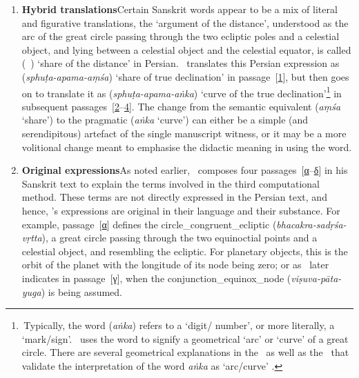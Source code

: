 \begin{enumerate}[topsep=0pt]
    \item \textbf{Hybrid translations}\quad Certain Sanskrit words appear to be a mix of literal and figurative translations, \eg 
    the `argument of the distance', understood as the arc of the great circle passing through the two ecliptic poles and a celestial object, and lying between a celestial object and the celestial equator, is called  (\hissi\idafavowel\ \bud) `share of the distance' in Persian.
    \Nityananda\ translates this Persian expression as  (\textit{sphuṭa-apama-aṃśa}) `share of true declination' in passage~[\hyperlink{SEpass1}{1}], but then goes on to translate it as  (\textit{sphuṭa-apama-aṅka}) `curve of the true declination'\footnote{\,Typically, the word  (\textit{aṅka}) refers to a `digit/ number', or more literally, a `mark/sign'. \Nityananda\ uses the word to signify a geometrical `arc' or `curve' of a great circle. There are several geometrical explanations in the \Siddhantasindhu\ as well as the \Sarvasiddhantaraja\ that validate the interpretation of the word \textit{aṅka} as `arc/curve' \parencite[\eg \vid][279]{Misrathesis}.} in subsequent passages~[\hyperlink{SEpass2}{2}--\hyperlink{SEpass4}{4}]. The change from the semantic equivalent (\textit{aṃśa} `share') to the pragmatic (\textit{aṅka} `curve') can either be a simple (and serendipitous) artefact of the single manuscript witness, or it may be a more volitional change meant to emphasise the didactic meaning in using the word.  

    \item \textbf{Original expressions}\quad  As noted earlier, \Nityananda\ composes four passages~[\hyperlink{SpassA}{α}--\hyperlink{SpassD}{δ}] in his Sanskrit text to explain the
    terms involved in the third computational method. These terms are not directly expressed in the Persian text, and hence, \Nityananda's expressions are original in their language and their substance. For example, passage~[\hyperlink{SEpassA}{α}] defines the \gls{circle_congruent_ecliptic}  (\textit{bhacakra-sadṛśa-vṛtta}), a great circle passing through the two equinoctial points and a celestial object, and resembling the ecliptic. For planetary objects, this is the orbit of the planet with the longitude of its node being zero; or as \Nityananda\ later indicates in passage~[\hyperlink{SEpassC}{γ}], when the \gls{conjunction_equinox_node}  (\textit{viṣuva-pāta-yuga}) is being assumed.
    

\end{enumerate}
